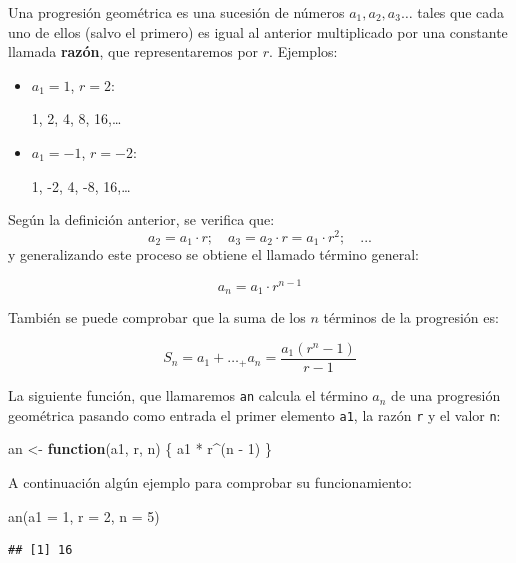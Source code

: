 \documentclass[
]{book}
\newenvironment{Shaded}{\begin{snugshade}}{\end{snugshade}}
\newcommand{\AttributeTok}[1]{\textcolor[rgb]{0.77,0.63,0.00}{#1}}
\newcommand{\ControlFlowTok}[1]{\textcolor[rgb]{0.13,0.29,0.53}{\textbf{#1}}}
\newcommand{\DecValTok}[1]{\textcolor[rgb]{0.00,0.00,0.81}{#1}}
\newcommand{\FunctionTok}[1]{\textcolor[rgb]{0.00,0.00,0.00}{#1}}
\newcommand{\NormalTok}[1]{#1}
\newcommand{\OtherTok}[1]{\textcolor[rgb]{0.56,0.35,0.01}{#1}}
\newcommand{\SpecialCharTok}[1]{\textcolor[rgb]{0.00,0.00,0.00}{#1}}
\theoremstyle{break}
\begin{document}
Una progresión geométrica es una sucesión de números \(a_1, a_2, a_3\ldots\)
tales que cada uno de ellos (salvo el primero) es igual al anterior
multiplicado por una constante llamada \textbf{razón}, que representaremos
por \(r\). Ejemplos:

\begin{itemize}
\item
  \(a_1=1\), \(r=2\):

  1, 2, 4, 8, 16,\ldots{}
\item
  \(a_1=-1\), \(r=-2\):

  1, -2, 4, -8, 16,\ldots{}
\end{itemize}

Según la definición anterior, se verifica que:
\[a_2=a_1\cdot r; \quad a_3=a_2\cdot r=a_1\cdot r^2; \quad ...\] y
generalizando este proceso se obtiene el llamado término general:

\[a_n=a_1\cdot r^{n-1}\]

También se puede comprobar que la suma de los \(n\) términos de la
progresión es:

\[S_n=a_1+\ldots_+a_n=\frac{a_1(r^n-1)}{r-1}\]

La siguiente función, que llamaremos \texttt{an} calcula el término
\(a_n\) de una progresión geométrica pasando como entrada el primer
elemento \texttt{a1}, la razón \texttt{r} y el valor \texttt{n}:

\begin{Shaded}
\begin{Highlighting}[]
\NormalTok{an }\OtherTok{\textless{}{-}} \ControlFlowTok{function}\NormalTok{(a1, r, n) \{}
\NormalTok{        a1 }\SpecialCharTok{*}\NormalTok{ r}\SpecialCharTok{\^{}}\NormalTok{(n }\SpecialCharTok{{-}} \DecValTok{1}\NormalTok{)}
\NormalTok{      \}}
\end{Highlighting}
\end{Shaded}

A continuación algún ejemplo para comprobar su funcionamiento:

\begin{Shaded}
\begin{Highlighting}[]
\FunctionTok{an}\NormalTok{(}\AttributeTok{a1 =} \DecValTok{1}\NormalTok{, }\AttributeTok{r =} \DecValTok{2}\NormalTok{, }\AttributeTok{n =} \DecValTok{5}\NormalTok{)}
\end{Highlighting}
\end{Shaded}

\begin{verbatim}
## [1] 16
\end{verbatim}
\end{document}
